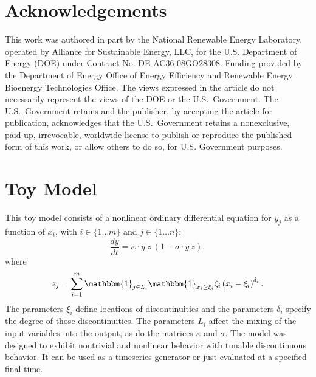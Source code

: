 \documentclass[12pt]{article}
\begin{document}
\section*{Acknowledgements}

This work was authored in part by the National Renewable Energy Laboratory, operated by Alliance for Sustainable Energy, LLC, for the U.S. Department of Energy (DOE) under Contract No. DE-AC36-08GO28308. Funding provided by the Department of Energy Office of Energy Efficiency and Renewable Energy Bioenergy Technologies Office. The views expressed in the article do not necessarily represent the views of the DOE or the U.S.\ Government. The U.S.\ Government retains and the publisher, by accepting the article for publication, acknowledges that the U.S.\ Government retains a nonexclusive, paid-up, irrevocable, worldwide license to publish or reproduce the published form of this work, or allow others to do so, for U.S. Government purposes.



\printbibliography


\appendix


\section{Toy Model}
\label{sec:toyapp}

This toy model consists of a nonlinear ordinary differential equation for $y_j$ as a function of $x_i$, with $i \in \{ 1 \ldots m \}$ and $j \in \{ 1 \ldots n \}$:
\begin{equation*}
    \frac{dy}{dt} = \kappa \cdot y \ z \ \left( 1 - \sigma \cdot y \  z \right) ,
\end{equation*}
where
\begin{equation*}
    z_j = \sum_{i=1}^m \mathbbm{1}_{j \in L_i} \mathbbm{1}_{x_i \ge \xi_i} \zeta_i \left( x_i - \xi_i \right)^{\delta_i} .
\end{equation*}
The parameters $\xi_i$ define locations of discontinuities and the parameters $\delta_i$ specify the degree of those discontinuities. The parameters $L_i$ affect the mixing of the input variables into the output, as do the matrices $\kappa$ and $\sigma$. The model was designed to exhibit nontrivial and nonlinear behavior with tunable discontinuous behavior. It can be used as a timeseries generator or just evaluated at a specified final time.
\end{document}
